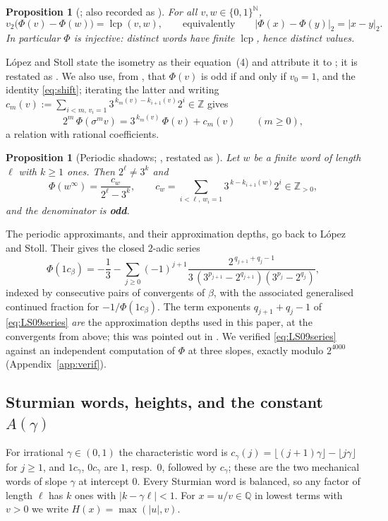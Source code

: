 \documentclass[11pt,reqno]{amsart}
\theoremstyle{plain}
\newtheorem{proposition}[theorem]{Proposition}
\theoremstyle{definition}
\DeclareMathOperator{\lcp}{lcp}
\newcommand{\N}{\mathbb{N}}
\newcommand{\Z}{\mathbb{Z}}
\newcommand{\Q}{\mathbb{Q}}
\newcommand{\PH}{\Phi}
\newcommand{\Av}{A(\gamma)}
\newcommand{\vtwo}{v_2}
\begin{document}
\begin{proposition}[{\cite{BL96}; also recorded as \cite[eq.~(4), \S1]{LS21}}]\label{prop:iso}
For all $v,w\in\{0,1\}^{\N}$,
\[
  \vtwo\bigl(\PH(v)-\PH(w)\bigr)=\lcp(v,w),
  \qquad\text{equivalently}\qquad |\PH(x)-\PH(y)|_2=|x-y|_2 .
\]
In particular $\PH$ is injective: distinct words have finite $\lcp$, hence distinct values.
\end{proposition}

L\'opez and Stoll state the isometry as their equation~(4) and attribute it to \cite{BL96}; it is
restated as \cite[Proposition 2.2]{DJirr}. We also use, from \cite[\S1]{BL96}, that $\PH(v)$ is odd
if and only if $v_0=1$, and the identity \eqref{eq:shift}; iterating the latter and writing
$c_m(v):=\sum_{i<m,\,v_i=1}3^{\,k_m(v)-k_{i+1}(v)}2^{i}\in\Z$ gives
\begin{equation}\label{eq:affinegen}
  2^{m}\,\PH(\sigma^{m}v)=3^{\,k_m(v)}\,\PH(v)+c_m(v)\qquad(m\ge0),
\end{equation}
a relation with rational coefficients.

\begin{proposition}[{Periodic shadows; \cite[Theorem 1 and Lemma 12]{LS09}, restated as
\cite[Proposition 4.1]{DJirr}}]\label{prop:shadow}
Let $w$ be a finite word of length $\ell$ with $k\ge1$ ones. Then $2^{\ell}\ne3^{k}$ and
\[
  \PH(w^{\infty})=\frac{c_w}{2^{\ell}-3^{k}},\qquad
  c_w=\sum_{i<\ell,\,w_i=1}3^{\,k-k_{i+1}(w)}2^{i}\in\Z_{>0},
\]
and the denominator is \textbf{odd}.
\end{proposition}

The periodic approximants, and their approximation depths, go back to L\'opez and Stoll. Their
\cite[Theorem 1]{LS09} gives the closed $2$-adic series
\begin{equation}\label{eq:LS09series}
  \PH(1c_{\beta})=-\frac13-\sum_{j\ge0}(-1)^{j+1}
  \frac{2^{\,q_{j+1}+q_j-1}}{3\,(3^{p_{j+1}}-2^{q_{j+1}})(3^{p_j}-2^{q_j})},
\end{equation}
indexed by consecutive pairs of convergents of $\beta$, with \cite[Corollary 2]{LS09} the associated
generalised continued fraction for $-1/\PH(1c_\beta)$. The term exponents $q_{j+1}+q_j-1$ of
\eqref{eq:LS09series} \emph{are} the approximation depths used in this paper, at the convergents
from above; this was pointed out in \cite[\S1]{DJirr}. We verified \eqref{eq:LS09series} against an
independent computation of $\PH$ at three slopes, exactly modulo $2^{4000}$
(Appendix~\ref{app:verif}).

\subsection{Sturmian words, heights, and the constant \texorpdfstring{$\Av$}{A(gamma)}}
For irrational $\gamma\in(0,1)$ the characteristic word is $c_\gamma(j)=\lfloor(j+1)\gamma\rfloor
-\lfloor j\gamma\rfloor$ for $j\ge1$, and $1c_\gamma$, $0c_\gamma$ are $1$, resp.\ $0$, followed by
$c_\gamma$; these are the two mechanical words of slope $\gamma$ at intercept $0$. Every Sturmian
word is balanced, so any factor of length $\ell$ has $k$ ones with $|k-\gamma\ell|<1$. For
$x=u/v\in\Q$ in lowest terms with $v>0$ we write $H(x)=\max(|u|,v)$.
\end{document}
